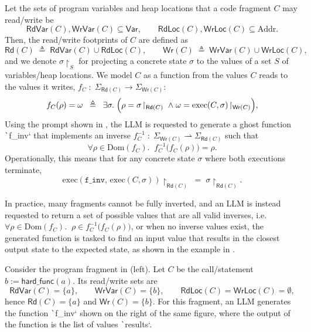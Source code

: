 \documentclass[acmsmall,screen,nonacm]{acmart}
\theoremstyle{definition}
\begin{document}
Let the sets of program variables and heap locations that a code fragment \(C\) may read/write be
\[
\mathsf{RdVar}(C),\mathsf{WrVar}(C)\subseteq \mathsf{Var},\qquad
\mathsf{RdLoc}(C),\mathsf{WrLoc}(C)\subseteq \mathrm{Addr}.
\]
Then, the read/write footprints of \(C\) are defined as
\[
\mathsf{Rd}(C)\;\triangleq\;\mathsf{RdVar}(C)\cup \mathsf{RdLoc}(C),
\qquad
\mathsf{Wr}(C)\;\triangleq\;\mathsf{WrVar}(C)\cup \mathsf{WrLoc}(C),
\]
and we denote \(\sigma\!\upharpoonright_{S}\) for projecting a concrete state \(\sigma\) to the values of a set \(S\) of variables/heap locations. We model \(C\) as a function from the values $C$ reads to the values it writes, $f_C \;:\; \Sigma_{\mathsf{Rd}(C)} \rightarrow \Sigma_{\mathsf{Wr}(C)}$:
\[
f_C(\rho)=\omega
\;\;\triangleq\;\;
\exists \sigma.\;
\Bigl(\rho=\sigma\!\upharpoonright_{\mathsf{Rd}(C)}
\;\wedge\;
\omega=\mathrm{exec}(C,\sigma)\!\upharpoonright_{\mathsf{Wr}(C)}\Bigr),
\]
\noindent Using the prompt shown in , the LLM is requested to generate a ghost function \texttt`f\_inv` that implements an inverse $f^{-1}_C \;:\; \Sigma_{\mathsf{Wr}(C)} \rightharpoonup \Sigma_{\mathsf{Rd}(C)}$ such that
\[
\forall \rho\in \mathrm{Dom}(f_C).\;\;
f^{-1}_C\!\bigl(f_C(\rho)\bigr)=\rho.
\]
Operationally, this means that for any concrete state \(\sigma\) where both executions terminate,
\[
\mathrm{exec}(\mathtt{f\_inv},\,\mathrm{exec}(C,\sigma))\!\upharpoonright_{\mathsf{Rd}(C)}
\;=\;
\sigma\!\upharpoonright_{\mathsf{Rd}(C)}.
\]

In practice, many fragments cannot be fully inverted, and an LLM is instead requested to return a set of possible values that are all valid inverses, i.e. $\forall \rho\in \mathrm{Dom}(f_C).\;\; \rho \in f^{-1}_C\!\bigl(f_C(\rho)\bigr)$, or when no inverse values exist, the generated function is tasked to find an input value that results in the closest output state to the expected state, as shown in the example in .

\begin{example}
  Consider the program fragment in  (left). Let $C$ be the call/statement $b := \mathsf{hard\_func}(a)$. Its read/write sets are 
\[
\mathsf{RdVar}(C)=\{a\},\qquad \mathsf{WrVar}(C)=\{b\},\qquad \mathsf{RdLoc}(C)=\mathsf{WrLoc}(C)=\emptyset,
\]
hence $\mathsf{Rd}(C)=\{a\}$ and $\mathsf{Wr}(C)=\{b\}$. For this fragment, an LLM generates the function \texttt`f_inv` shown on the right of the same figure, where the output of the function is the list of values \texttt`results`.
\end{example}
  
\end{document}
